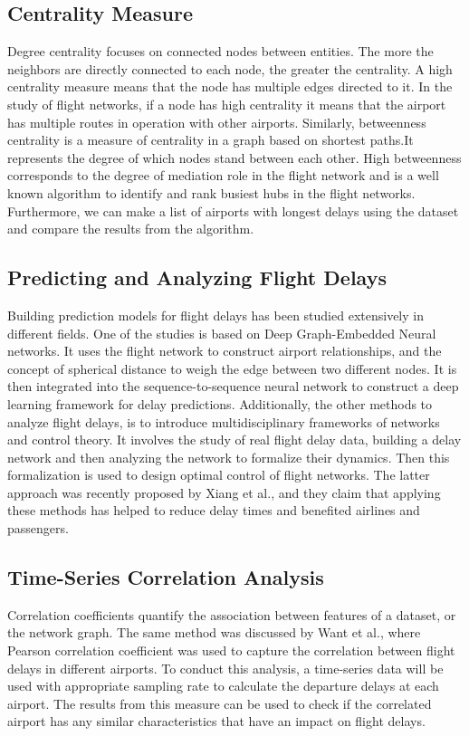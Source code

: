 \documentclass[sigconf,nonacm]{acmart}
\begin{document}
\subsection{Centrality Measure}
Degree centrality focuses on connected nodes between entities. The more the neighbors are directly connected to each node, the greater the centrality. A high centrality measure means that the node has multiple edges directed to it. In the study of flight networks, if a node has high centrality it means that the airport has multiple routes in operation with other airports. Similarly, betweenness centrality is a measure of centrality in a graph based on shortest paths.It represents the degree of which nodes stand between each other. High betweenness corresponds to the degree of mediation role in the flight network and is a well known algorithm to identify and rank busiest hubs in the flight networks. Furthermore, we can make a list of airports with longest delays using the dataset and compare the results from the algorithm.\cite{datares_2020_analyzing}

\subsection{Predicting and Analyzing Flight Delays}
Building prediction models for flight delays has been studied extensively in different fields. One of the studies is based on Deep Graph-Embedded Neural networks. It uses the flight network to construct airport relationships, and the concept of spherical distance to weigh the edge between two different nodes. It is then integrated into the sequence-to-sequence neural network to construct a deep learning framework for delay predictions. Additionally, the other methods to analyze flight delays, is to introduce multidisciplinary frameworks of networks and control theory. It involves the study of real flight delay data, building a delay network and then analyzing the network to formalize their dynamics. Then this formalization is used to design optimal control of flight networks. The latter approach was recently proposed by Xiang et al.\cite{Niu2021}, and they claim that applying these methods has helped to reduce delay times and benefited airlines and passengers.

\subsection{Time-Series Correlation Analysis}

Correlation coefficients quantify the association between features of a dataset, or the network graph. The same method was discussed by Want et al.\cite{Wang2020}, where Pearson correlation coefficient was used to capture the correlation between flight delays in different airports. To conduct this analysis, a time-series data will be used with appropriate sampling rate to calculate the departure delays at each airport. The results from this measure can be used to check if the correlated airport has any similar characteristics that have an impact on flight delays.
\end{document}
